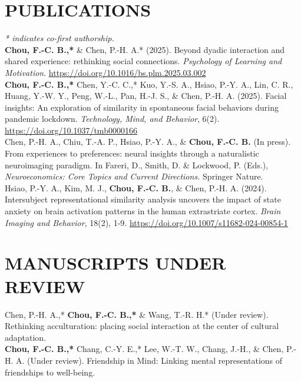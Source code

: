 \documentclass[a4paper,12pt]{article}
\newcommand{\itemspace}{7pt} %
\begin{document}
\section*{PUBLICATIONS}
\textit{* indicates co-first authorship.} \\[10pt]
\noindent \textbf{Chou, F.-C. B.,*} \& Chen, P.-H. A.* (2025). Beyond dyadic interaction and shared experience: rethinking social connections. \textit{Psychology of Learning and Motivation}. \href{https://10.1016/bs.plm.2025.03.002}{https://doi.org/10.1016/bs.plm.2025.03.002} \\[\itemspace]
\noindent\textbf{Chou, F.-C. B.,*} Chen, Y.-C. C.,* Kuo, Y.-S. A., Hsiao, P.-Y. A., Lin, C. R., Huang, Y.-W. Y., Peng, W.-L., Pan, H.-J. S., \& Chen, P.-H. A. (2025). Facial insights: An exploration of similarity in spontaneous facial behaviors during pandemic lockdown. \textit{Technology, Mind, and Behavior}, 6(2). \href{https://doi.org/10.1037/tmb0000166}{https://doi.org/10.1037/tmb0000166} \\[\itemspace]
\noindent Chen, P.-H. A., Chiu, T.-A. P., Hsiao, P.-Y. A., \& \textbf{Chou, F.-C. B.} (In press). From experiences to preferences: neural insights through a naturalistic neuroimaging paradigm. In Fareri, D., Smith, D. \& Lockwood, P. (Eds.), \textit{Neuroeconomics: Core Topics and Current Directions.} Springer Nature.\\[\itemspace]
\noindent Hsiao, P.-Y. A., Kim, M. J., \textbf{Chou, F.-C. B.}, \& Chen, P.-H. A. (2024). Intersubject representational similarity analysis uncovers the impact of state anxiety on brain activation patterns in the human extrastriate cortex. \textit{Brain Imaging and Behavior}, 18(2), 1-9. \href{https://doi.org/10.1007/s11682-024-00854-1}{https://doi.org/10.1007/s11682-024-00854-1}
\\[\itemspace]

\section*{MANUSCRIPTS UNDER REVIEW}
\noindent Chen, P.-H. A.,* \textbf{Chou, F.-C. B.,*} \& Wang, T.-R. H.* (Under review). Rethinking acculturation: placing social interaction at the center of cultural adaptation.\\[\itemspace]
\noindent \textbf{Chou, F.-C. B.,*} Chang, C.-Y. E.,* Lee, W.-T. W., Chang, J.-H., \& Chen, P.-H. A. (Under review). Friendship in Mind: Linking mental representations of friendships to well-being.\\[\itemspace]
\end{document}
